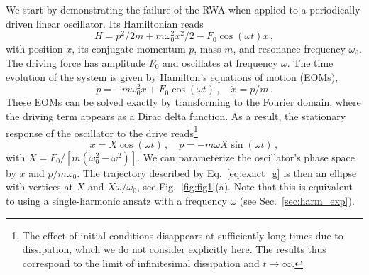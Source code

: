 We start by demonstrating the failure of the RWA when applied to a periodically driven linear oscillator. Its Hamiltonian reads
\begin{equation} \label{eq:qho}
H =p^2/2m+m\omega_0^2x^2/2-F_0\cos(\omega t) x\,,
\end{equation}
with position $x$, its conjugate momentum $p$, mass $m$, and resonance frequency $\omega_0$. The driving force has amplitude $F_0$ and oscillates at frequency $\omega$. The time evolution of the system is given by Hamilton's equations of motion (EOMs),
\begin{equation} \label{eq:sho}
\dot{p} = -m \omega_0^2 x + F_0 \cos(\omega t) \,, \quad \dot{x} = p / m \,.
\end{equation}
These EOMs can be solved exactly by transforming to the Fourier domain, where the driving term appears as a Dirac delta function. As a result, the stationary response of the oscillator to the drive reads\footnote{The effect of initial conditions disappears at sufficiently long times due to dissipation, which we do not consider explicitly here. The results thus correspond to the limit of infinitesimal dissipation and $t\rightarrow \infty$.}
\begin{equation} \label{eq:exact_g}
x = X \cos(\omega t) \,, \quad p = -m\omega X \sin(\omega t)\,,
\end{equation}
with $X =F_0/\left[m(\omega_0^2 - \omega^2)\right]$.
We can parameterize the oscillator's phase space by $x$ and $p/ m\omega_0$. The trajectory described by Eq.~\eqref{eq:exact_g} is then an ellipse with vertices at $X$ and $X \omega/\omega_0$, see Fig.~\ref{fig:fig1}(a). Note that this is equivalent to using a single-harmonic ansatz with a frequency $\omega$ (see Sec.~\ref{sec:harm_exp}).

